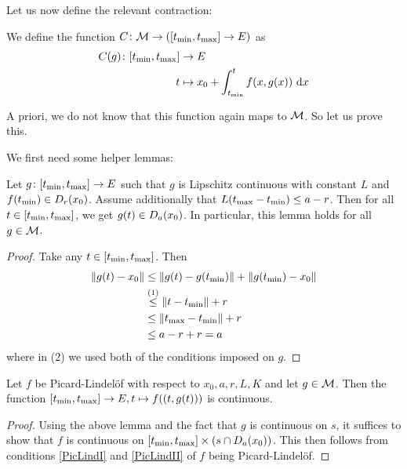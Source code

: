 Let us now define the relevant contraction: 

\begin{defi}\label{defi:contraction}
We define the function $C \colon \mathcal{M} \to ([t_{\text{min}}, t_{\text{max}}] \to E)$ as 
\begin{equation*}
    \begin{split}
        C(g) \colon [t_{\text{min}}, t_{\text{max}}] &\to E \\
        t &\mapsto x_0 + \int_{t_{\text{min}}}^t f(x, g(x)) \mathop{}\mathrm{d} x
    \end{split}
\end{equation*}
\end{defi}

A priori, we do not know that this function again maps to $\mathcal{M}$.
So let us prove this. 

We first need some helper lemmas: 

\begin{lem}\label{lem:funInBall}
Let $g \colon [t_{\text{min}}, t_{\text{max}}] \to E$ such that $g$ is Lipschitz continuous with constant $L$ and $f (t_{\text{min}}) \in D_{r}(x_0)$. 
Assume additionally that $L (t_{\text{max}} - t_{\text{min}}) \le a - r$. Then for all $t \in [t_{\text{min}}, t_{\text{max}}]$, we get $g (t) \in D_{a}(x_0)$. 
In particular, this lemma holds for all $g \in \mathcal{M}$.
\end{lem}
\begin{proof}
Take any $t \in [t_{\text{min}}, t_{\text{max}}]$. Then
\begin{equation*}
    \begin{split}
        \left\lVert g(t) - x_0\right\rVert &\le \left\lVert g(t) - g(t_{\text{min}})\right\rVert + \left\lVert g(t_{\text{min}}) - x_0\right\rVert \\
        &\stackrel{(1)}{\le} \left\lVert t - t_{\text{min}}\right\rVert + r \\ 
        &\le \left\lVert t_{\text{max}} - t_{\text{min}}\right\rVert + r \\
        &\le a - r + r = a
    \end{split}
\end{equation*}
where in (2) we used both of the conditions imposed on $g$. 
\end{proof}

\begin{lem}\label{lem:contFunInInt}
Let $f$ be Picard-Lindelöf with respect to $x_0, a, r, L, K$ and let $g \in \mathcal{M}$. 
Then the function $[t_{\text{min}}, t_{\text{max}}] \to E, t \mapsto f ((t, g(t)))$ is continuous. 
\end{lem}
\begin{proof}
Using the above lemma and the fact that $g$ is continuous on $s$, it suffices to show that $f$ is continuous on $[t_{\text{min}}, t_{\text{max}}] \times (s \cap D_{a}(x_0))$. 
This then follows from conditions \ref{PicLindI} and \ref{PicLindII} of $f$ being Picard-Lindelöf. 
\end{proof}

